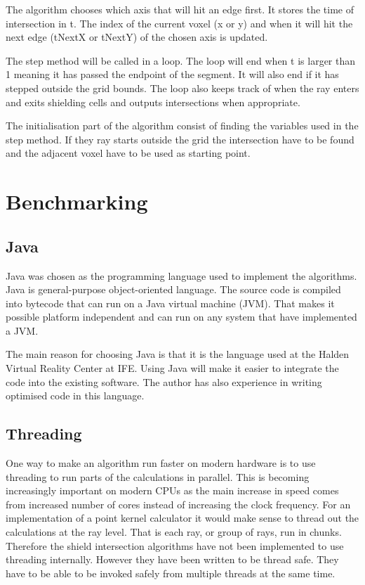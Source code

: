 \documentclass[11pt,twoside,a4paper]{report}
\begin{document}
The algorithm chooses which axis that will hit an edge first. It stores the time of intersection in t. The index of the current voxel (x or y) and when it will hit the next edge (tNextX or tNextY) of the chosen axis is updated. 

The step method will be called in a loop. The loop will end when t is larger than 1 meaning it has passed the endpoint of the segment. It will also end if it has stepped outside the grid bounds. The loop also keeps track of when the ray enters and exits shielding cells and outputs intersections when appropriate.

The initialisation part of the algorithm consist of finding the variables used in the step method. If they ray starts outside the grid the intersection have to be found and the adjacent voxel have to be used as starting point. 

\section{Benchmarking}
\label{section:Design_Benchmarking}

\subsection{Java}
Java \cite{wiki:java} was chosen as the programming language used to implement the algorithms. Java is general-purpose object-oriented language. The source code is compiled into bytecode that can run on a Java virtual machine (JVM). That makes it possible platform independent and can run on any system that have implemented a JVM. 

The main reason for choosing Java is that it is the language used at the Halden Virtual Reality Center \cite{site:hvrc} at IFE. Using Java will make it easier to integrate the code into the existing software. The author has also experience in writing optimised code in this language.

\subsection{Threading}
One way to make an algorithm run faster on modern hardware is to use threading to run parts of the calculations in parallel. This is becoming increasingly important on modern CPUs as the main increase in speed comes from increased number of cores instead of increasing the clock frequency. For an implementation of a point kernel calculator it would make sense to thread out the calculations at the ray level. That is each ray, or group of rays, run in chunks. Therefore the shield intersection algorithms have not been implemented to use threading internally. However they have been written to be thread safe. They have to be able to be invoked safely from multiple threads at the same time. 
\end{document}
